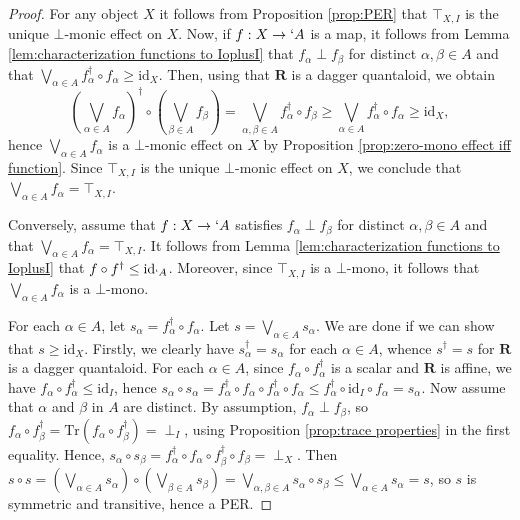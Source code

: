 \documentclass[12pt]{tac}
\theoremstyle{definition}
\theoremstyle{remark}
\newcommand{\<}{\langle}
\renewcommand{\>}{\rangle}
\renewcommand{\:}{\colon}
\newcommand{\Tr}{\mathrm{Tr}}
\newcommand{\id}{\mathrm{id}}
\begin{document}
\begin{proof}
For any object $X$ it follows from Proposition \ref{prop:PER} that $\top_{X,I}$ is the unique $\bot$-monic effect on $X$. 
Now, if $f:X\to`A$ is a map, it follows from Lemma \ref{lem:characterization functions to IoplusI} that $f_\alpha\perp f_\beta$ for distinct $\alpha,\beta\in A$ and that $\bigvee_{\alpha\in A}f^\dag_\alpha\circ f_\alpha\geq\id_X$. Then, using that $\mathbf R$ is a dagger quantaloid, we obtain
\[\left(\bigvee_{\alpha\in A}f_{\alpha}\right)^\dag\circ \left(\bigvee_{\beta\in A}f_\beta\right)=\bigvee_{\alpha,\beta\in A}f_\alpha^\dag\circ f_\beta\geq \bigvee_{\alpha\in A}f_\alpha^\dag\circ f_\alpha\geq\id_X,\]
hence $\bigvee_{\alpha\in A}f_\alpha$ is a $\bot$-monic effect on $X$ by Proposition \ref{prop:zero-mono effect iff function}.  Since $\top_{X,I}$ is the unique $\bot$-monic effect on $X$, we conclude that $\bigvee_{\alpha\in A}f_{\alpha}=\top_{X,I}$.

Conversely, assume that $f:X\to`A$ satisfies $f_\alpha\perp f_\beta$ for distinct $\alpha,\beta\in A$ and that $\bigvee_{\alpha\in A}f_\alpha= \top_{X,I}$. It follows from Lemma \ref{lem:characterization functions to IoplusI} that $f\circ f^\dag\leq\id_{`A}$. Moreover, since $\top_{X,I}$ is a $\bot$-mono, it follows that $\bigvee_{\alpha\in A}f_\alpha$ is a $\bot$-mono.


For each $\alpha\in A$, let $s_\alpha=f_\alpha^\dag\circ f_\alpha$. Let $s=\bigvee_{\alpha\in A}s_\alpha$. We are done if we can show that $s\geq\id_X$. Firstly, we clearly have $s_\alpha^\dag=s_\alpha$ for each $\alpha\in A$, whence $s^\dag=s$ for $\mathbf R$ is a dagger quantaloid. For each $\alpha\in A$, since $f_\alpha\circ f_\alpha^\dag$ is a scalar and $\mathbf R$ is affine, we have $f_\alpha\circ f_\alpha^\dag\leq\id_I$, hence $s_\alpha\circ s_\alpha=f_\alpha^\dag\circ f_\alpha\circ f_\alpha^\dag\circ f_\alpha\leq f_\alpha^\dag\circ\id_I\circ f_\alpha=s_\alpha$.
Now assume that $\alpha$ and $\beta$ in $A$ are distinct. By assumption, $f_\alpha\perp f_\beta$, so $f_\alpha\circ f_\beta^\dag=\Tr(f_\alpha\circ f_\beta^\dag)=\perp_I$, using Proposition \ref{prop:trace properties} in the first equality. Hence, $s_\alpha\circ s_\beta=f_\alpha^\dag\circ f_\alpha\circ f_\beta^\dag\circ f_\beta=\perp_X$. Then $s\circ s=\left(\bigvee_{\alpha\in A}s_\alpha\right)\circ\left(\bigvee_{\beta\in A}s_\beta\right)=\bigvee_{\alpha,\beta\in A}s_\alpha\circ s_\beta\leq \bigvee_{\alpha\in A}s_\alpha=s$, so $s$ is symmetric and transitive, hence a PER.




\end{proof}
\end{document}
